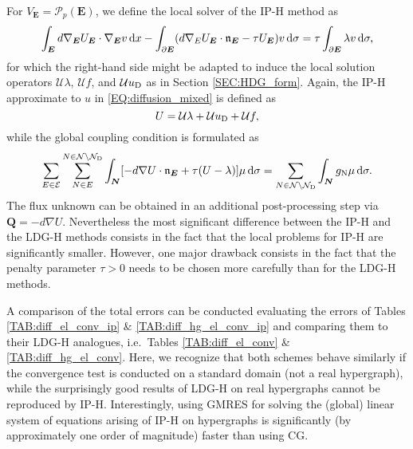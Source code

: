 \documentclass[a4paper, english, 12pt, reqno, draft]{amsart}
\theoremstyle{definition}
\theoremstyle{remark}
\numberwithin{equation}{section}
\newcommand{\setEdge}{\ensuremath{\mathcal E}}
\newcommand{\setNode}{\ensuremath{\mathcal N}}
\newcommand{\setNodeDir}{\ensuremath{\setNode_\textup D}}
\newcommand{\edge}{\ensuremath{E}}
\newcommand{\node}{\ensuremath{N}}
\newcommand{\Edge}{{\ensuremath{\boldsymbol E}}}
\newcommand{\Node}{{\ensuremath{\boldsymbol N}}}
\newcommand{\Normal}{\ensuremath{\mathfrak n_\Edge}}
\newcommand{\polynomials}{\ensuremath{\mathcal P}}
\renewcommand{\vec}[1]{\ensuremath{\boldsymbol{#1}}}
\newcommand{\dx}{\ensuremath{\, \textup d x}}
\newcommand{\ds}{\ensuremath{\, \textup d \sigma}}
\newcommand{\localU}{\ensuremath{\mathcal U}}
\begin{document}
For $V_\Edge = \polynomials_p(\Edge)$, we define the local solver of the IP-H method as
%
\begin{equation}
 \int_\Edge d \nabla_\Edge U_\Edge \cdot \nabla_\Edge v \dx - \int_{\partial \Edge} (d \nabla_\edge U_\Edge \cdot \Normal - \tau U_\Edge ) v \ds = \tau \int_{\partial \Edge} \lambda v \ds,
\end{equation}
% 
for which the right-hand side might be adapted to induce the local solution operators $\localU \lambda$, $\localU f$, and $\localU u_\textup D$ as in Section \ref{SEC:HDG_form}. Again, the IP-H approximate to $u$ in \eqref{EQ:diffusion_mixed} is defined as
%
\begin{equation}
 U = \localU \lambda + \localU u_\textup D + \localU f,
\end{equation}
%
while the global coupling condition is formulated as
%
\begin{equation}
 \sum_{\edge \in \setEdge} \sum^{\node \in \setNode \setminus \setNodeDir}_{\node \in \edge} \int_\Node [ - d \nabla U \cdot \Normal + \tau (U - \lambda) ] \mu \ds = \sum_{\node \in \setNode \setminus \setNodeDir} \int_\Node g_\textup N \mu \ds.
\end{equation}
% 
The flux unknown can be obtained in an additional post-processing step via $\vec Q = - d \nabla U$. Nevertheless the most significant difference between the IP-H and the LDG-H methods consists in the fact that the local problems for IP-H are significantly smaller. However, one major drawback consists in the fact that the penalty parameter $\tau > 0$ needs to be chosen more carefully than for the LDG-H methods.

A comparison of the total errors can be conducted evaluating the errors of Tables \ref{TAB:diff_el_conv_ip} \& \ref{TAB:diff_hg_el_conv_ip} and comparing them to their LDG-H analogues, i.e.\ Tables \ref{TAB:diff_el_conv} \& \ref{TAB:diff_hg_el_conv}. Here, we recognize that both schemes behave similarly if the convergence test is conducted on a standard domain (not a real hypergraph), while the surprisingly good results of LDG-H on real hypergraphs cannot be reproduced by IP-H. Interestingly, using GMRES for solving the (global) linear system of equations arising of IP-H on hypergraphs is significantly (by approximately one order of magnitude) faster than using CG.
% 
\end{document}

